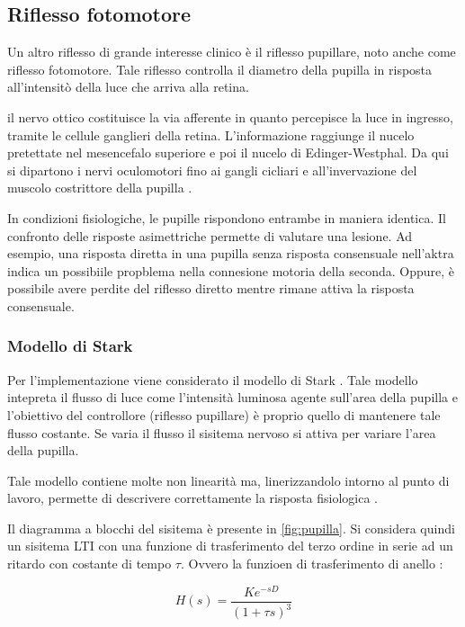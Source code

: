 \subsection{Riflesso fotomotore}

Un altro riflesso di grande interesse clinico è il riflesso pupillare, noto anche come riflesso fotomotore. Tale riflesso controlla il diametro della pupilla in risposta all'intensitò della luce che arriva alla retina.

il nervo ottico costituisce la via afferente in quanto percepisce la luce in ingresso, tramite  le cellule ganglieri della retina. L'informazione raggiunge il nucelo pretettate nel mesencefalo superiore e poi il nucelo di Edinger-Westphal. Da qui si dipartono i nervi oculomotori fino ai gangli cicliari e all'invervazione del muscolo costrittore della pupilla \cite{kandel_principles_2021}.

In condizioni fisiologiche, le pupille rispondono entrambe in maniera identica. Il confronto delle risposte asimettriche permette di valutare una lesione.
Ad esempio, una risposta diretta in una pupilla senza risposta consensuale nell'aktra indica un possibiile propblema nella connesione motoria della seconda. Oppure, è possibile avere perdite del riflesso diretto mentre rimane attiva la risposta consensuale. 

\subsubsection{Modello di Stark}

Per l'implementazione viene considerato il modello di Stark \cite{stark_servoanalytic_1957}. Tale modello intepreta il flusso di luce come l'intensità luminosa agente sull'area della pupilla e l'obiettivo del controllore (riflesso pupillare) è proprio quello di mantenere tale flusso costante. Se varia il flusso il sisitema nervoso si attiva per variare l'area della pupilla.

Tale modello contiene molte non linearità ma, linerizzandolo intorno al punto di lavoro, permette di descrivere correttamente la risposta fisiologica \cite{khoo_physiological_2018}.

Il diagramma a blocchi del sisitema è presente in \cref{fig:pupilla}. Si considera quindi un sisitema LTI con una funzione di trasferimento del terzo ordine in serie ad un ritardo con costante di tempo $\tau$. Ovvero la funzioen di trasferimento di anello :

\begin{equation}
	H(s)=\frac{K e^{-s D}}{(1+\tau s)^{3}}
\end{equation}

